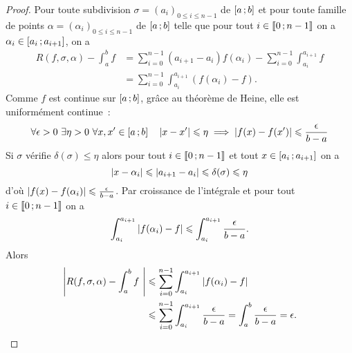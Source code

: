 \begin{proof}
  Pour toute subdivision \(\sigma=(a_i)_{0 \leqslant i \leqslant n-1}\) de \(\left[ a \, ;  b \right]\) et pour toute famille de points \(\alpha=(\alpha_i)_{0 \leqslant i \leqslant n-1}\) de \(\left[ a \, ;  b \right]\) telle que pour tout \(i \in \mathopen{\llbracket}0\mathclose{}\mathpunct{};n-1\mathclose{\rrbracket}\) on a \(\alpha_i \in \left[ a_i \, ;  a_{i+1} \right]\), on a
  \begin{align}
    R(f,\sigma,\alpha)- \int_a^b f &= \sum_{i=0}^{n-1}(a_{i+1}-a_i)f(\alpha_i) - \sum_{i=0}^{n-1} \int_{a_i}^{a_{i+1}} f \\
    &=\sum_{i=0}^{n-1} \int_{a_i}^{a_{i+1}} (f(\alpha_i)-f).
  \end{align}
  Comme \(f\) est continue sur \(\left[ a \, ;  b \right]\), grâce au théorème de Heine, elle est uniformément continue~:
  \begin{equation}
    \forall \epsilon >0 \ \exists \eta >0 \ \forall x,x' \in \intervalleff{a}{b} \quad \abs{x-x'} \leqslant \eta \implies \abs{f(x)-f(x')} \leqslant \frac{\epsilon}{b-a}
  \end{equation}
  Si \(\sigma\) vérifie \(\delta(\sigma) \leqslant \eta\) alors pour tout \(i \in \mathopen{\llbracket}0\mathclose{}\mathpunct{};n-1\mathclose{\rrbracket}\) et tout \(x \in \left[ a_i \, ;  a_{i+1} \right]\) on a
  \begin{equation}
    \left\lvert x-\alpha_i\right\rvert \leqslant \left\lvert a_{i+1}-a_i\right\rvert \leqslant \delta(\sigma) \leqslant \eta
  \end{equation}
  d'où \(\left\lvert f(x)-f(\alpha_i)\right\rvert \leqslant \frac{\epsilon}{b-a}\). Par croissance de l'intégrale et pour tout \(i \in \mathopen{\llbracket}0\mathclose{}\mathpunct{};n-1\mathclose{\rrbracket}\) on a
  \begin{equation}
    \int_{a_i}^{a_{i+1}} \left\lvert f(\alpha_i)-f\right\rvert \leqslant \int_{a_i}^{a_{i+1}}\frac{\epsilon}{b-a}.
  \end{equation}
  Alors
  \begin{align}
    \left\lvert R(f,\sigma,\alpha)- \int_a^b f~\right\rvert &\leqslant \sum_{i=0}^{n-1} \int_{a_i}^{a_{i+1}} \left\lvert f(\alpha_i)-f\right\rvert \\
    &\leqslant \sum_{i=0}^{n-1} \int_{a_i}^{a_{i+1}}\frac{\epsilon}{b-a} = \int_a^b \frac{\epsilon}{b-a}=\epsilon.
  \end{align}
\end{proof}

